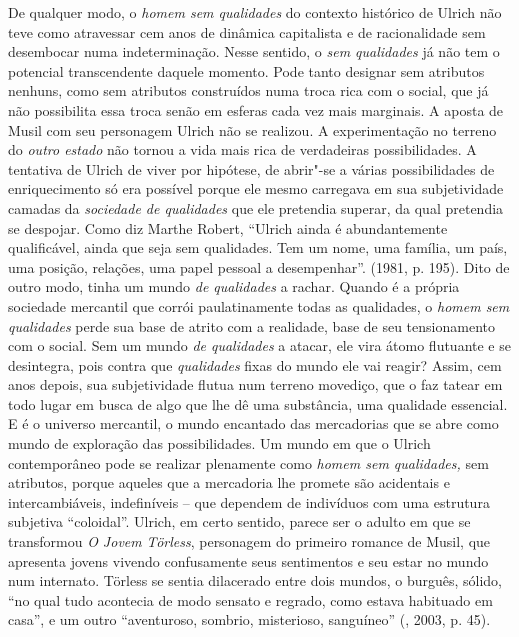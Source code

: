 De qualquer modo, o \emph{homem sem qualidades} do contexto histórico de
Ulrich não teve como atravessar cem anos de dinâmica capitalista e de
racionalidade sem desembocar numa indeterminação. Nesse sentido, o
\emph{sem qualidades} já não tem o potencial transcendente daquele
momento. Pode tanto designar sem atributos nenhuns, como sem atributos
construídos numa troca rica com o social, que já não possibilita essa
troca senão em esferas cada vez mais marginais. A aposta de Musil com
seu personagem Ulrich não se realizou. A experimentação no terreno do
\emph{outro estado} não tornou a vida mais rica de verdadeiras
possibilidades. A tentativa de Ulrich de viver por hipótese, de abrir"-se
a várias possibilidades de enriquecimento só era possível porque ele
mesmo carregava em sua subjetividade camadas da \emph{sociedade de
qualidades} que ele pretendia superar, da qual pretendia se despojar.
Como diz Marthe Robert, ``Ulrich ainda é abundantemente qualificável,
ainda que seja sem qualidades. Tem um nome, uma família, um país, uma
posição, relações, uma papel pessoal a desempenhar''. (1981, p. 195).
Dito de outro modo, tinha um mundo \emph{de qualidades} a rachar. Quando
é a própria sociedade mercantil que corrói paulatinamente todas as
qualidades, o \emph{homem sem qualidades} perde sua base de atrito com a
realidade, base de seu tensionamento com o social. Sem um mundo \emph{de
qualidades} a atacar, ele vira átomo flutuante e se desintegra, pois
contra que \emph{qualidades} fixas do mundo ele vai reagir? Assim, cem
anos depois, sua subjetividade flutua num terreno movediço, que o faz
tatear em todo lugar em busca de algo que lhe dê uma substância, uma
qualidade essencial. E é o universo mercantil, o mundo encantado das
mercadorias que se abre como mundo de exploração das possibilidades. Um
mundo em que o Ulrich contemporâneo pode se realizar plenamente como
\emph{homem sem qualidades,} sem atributos, porque aqueles que a
mercadoria lhe promete são acidentais e intercambiáveis, indefiníveis
-- que dependem de indivíduos com uma estrutura subjetiva ``coloidal''.
Ulrich, em certo sentido, parece ser o adulto em que se transformou
\emph{O Jovem} \emph{Törless}, personagem do primeiro romance de Musil,
que apresenta jovens vivendo confusamente seus sentimentos e seu estar
no mundo num internato. Törless se sentia dilacerado entre dois mundos,
o burguês, sólido, ``no qual tudo acontecia de modo sensato e regrado,
como estava habituado em casa'', e um outro ``aventuroso, sombrio,
misterioso, sanguíneo'' (, 2003, p. 45).

